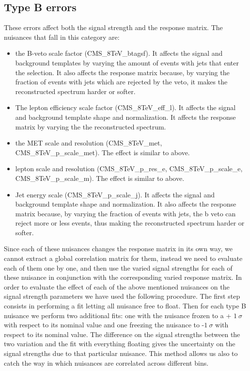 \subsection{Type B errors}
These errors affect both the signal strength and the response matrix. The nuisances that fall in this category are:
\begin{itemize}
\item the B-veto scale factor (CMS\_8TeV\_btagsf). It affects the signal and background templates by varying the amount of events with jets that enter the selection. It also affects the response matrix because, by varying the fraction of events with jets which are rejected by the veto, it makes the reconstructed spectrum harder or softer.
\item The lepton efficiency scale factor (CMS\_8TeV\_eff\_l). It affects the signal and background template shape and normalization. It affects the response matrix by varying the the reconstructed spectrum.
\item the MET scale and resolution (CMS\_8TeV\_met, CMS\_8TeV\_p\_scale\_met). The effect is similar to above.
\item lepton scale and resolution (CMS\_8TeV\_p\_res\_e, CMS\_8TeV\_p\_scale\_e, CMS\_8TeV\_p\_scale\_m). The effect is similar to above.
\item Jet energy scale (CMS\_8TeV\_p\_scale\_j). It affects the signal and background template shape and normalization. It also affects the response matrix because, by varying the fraction of events with jets, the b veto can reject more or less events, thus making the reconstructed spectrum harder or softer.
\end{itemize}
Since each of these nuisances changes the response matrix in its own way, we cannot extract a global correlation matrix for them, instead we need to evaluate each of them one by one, and then use the varied signal strengths for each of these nuisance in conjunction with the corresponding varied response matrix. In order to evaluate the effect of each of the above mentioned nuisances on the signal strength parameters we have used the following procedure. 
The first step consists in performing a fit letting all nuisance free to float. Then for each type B nuisance we perform two additional fits: one with the nuisance frozen to a + $1~\sigma$ with respect to its nominal value and one freezing the nuisance to -$1~\sigma$ with respect to its nominal value. The difference on the signal strengths between the two variation and the fit with everything floating gives the uncertainty on the signal strengths due to that particular nuisance. This method allows us also to catch the way in which nuisances are correlated across different \pth bins.

